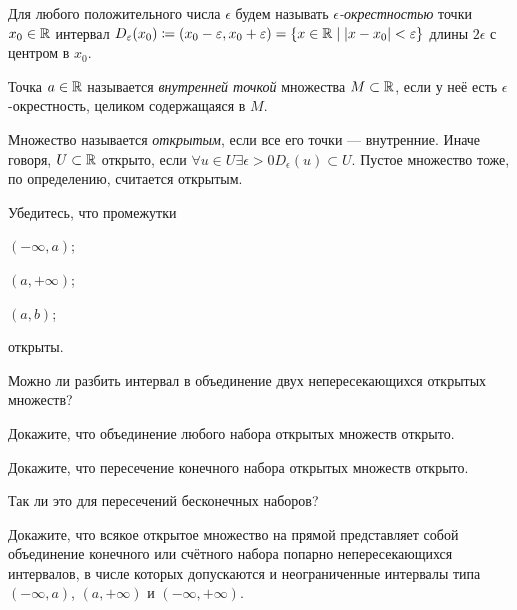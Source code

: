 \documentclass[a4paper, 12pt, num=28]{listok}
\begin{document}
\begin{definition}
	Для любого положительного числа $\epsilon$ будем называть \textit{$\epsilon$-окрестностью} точки $x_0 \in \mathbb{R}$ интервал
	$
		D_{\varepsilon}(x_0) \coloneq \left ( x_0 - \varepsilon, x_0 + \varepsilon \right )
		= \left \{ x \in \mathbb{R} \mid |x - x_0| < \varepsilon \right \}
	$
	длины $2 \epsilon$ с центром в $x_0$.
\end{definition}
\begin{definition}
	Точка $a \in \mathbb{R}$ называется \textit{внутренней точкой} множества $M \subset \mathbb{R}$,
	если у неё есть $\epsilon$-окрестность, целиком содержащаяся в $M$.
\end{definition}
\begin{definition}
	Множество называется \textit{открытым}, если все его точки --- внутренние.
	Иначе говоря, $U \subset \mathbb{R}$ открыто, если
	$\forall{u \in U} \exists{\epsilon > 0} D_{\epsilon}(u) \subset U$.
	Пустое множество тоже, по определению, считается открытым.
\end{definition}
\begin{problem}
	Убедитесь, что промежутки
	\begin{probparts}
		\item $(-\infty, a)$;
		\item $(a, +\infty)$;
		\item $(a, b)$;
	\end{probparts}
	открыты.
\end{problem}
\begin{problem}
	Можно ли разбить интервал в объединение двух непересекающихся открытых множеств?
\end{problem}
\begin{problem}
	Докажите, что объединение любого набора открытых множеств открыто.
\end{problem}
\begin{problem}
	\begin{probparts}
		\item Докажите, что пересечение конечного набора открытых множеств открыто.
		\item Так ли это для пересечений бесконечных наборов?
	\end{probparts}
\end{problem}
\begin{problem}
	Докажите, что всякое открытое множество на прямой представляет собой объединение конечного или счётного набора попарно непересекающихся интервалов,
	в числе которых допускаются и неограниченные интервалы типа $(-\infty, a)$, $(a, +\infty)$ и $(-\infty, +\infty)$.
\end{problem}
\end{document}
